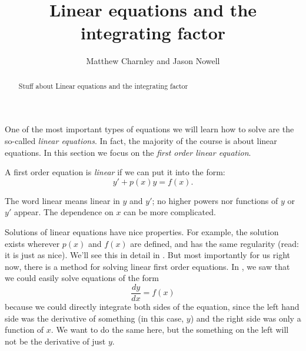\documentclass{ximera}
\title{Linear equations and the integrating factor}
\author{Matthew Charnley and Jason Nowell}
\begin{document}
\begin{abstract}
    Stuff about Linear equations and the integrating factor
\end{abstract}
\maketitle

\label{intfactor:section}



One of the most important types of equations we will learn how to solve are the so-called \emph{linear equations}. In fact, the majority of the course is about linear equations.  In this section we focus on the \emph{first order linear equation}.

\begin{definition}
    A first order equation is \emph{linear} if we can put it into the form:
    \begin{equation} \label{lineq:eq1}
        y' + p(x) y = f(x) .
    \end{equation}
\end{definition}

The word linear means linear in $y$ and $y'$; no higher powers nor functions of $y$ or $y'$ appear. The dependence on $x$ can be more complicated.

Solutions of linear equations have nice properties.  For example, the solution exists wherever $p(x)$ and $f(x)$ are defined, and has the same regularity (read: it is just as nice).  We'll see this in detail in . But most importantly for us right now, there is a method for solving linear first order equations.  In , we saw that we could easily  solve equations of the form \[ \frac{dy}{dx} = f(x) \] because we could directly integrate both sides of the equation, since the left hand side  was the derivative of something (in this case, $y$) and the right side was only a function of $x$. We want to do the same here, but the something on the left will not be the derivative of just $y$.
\end{document}
